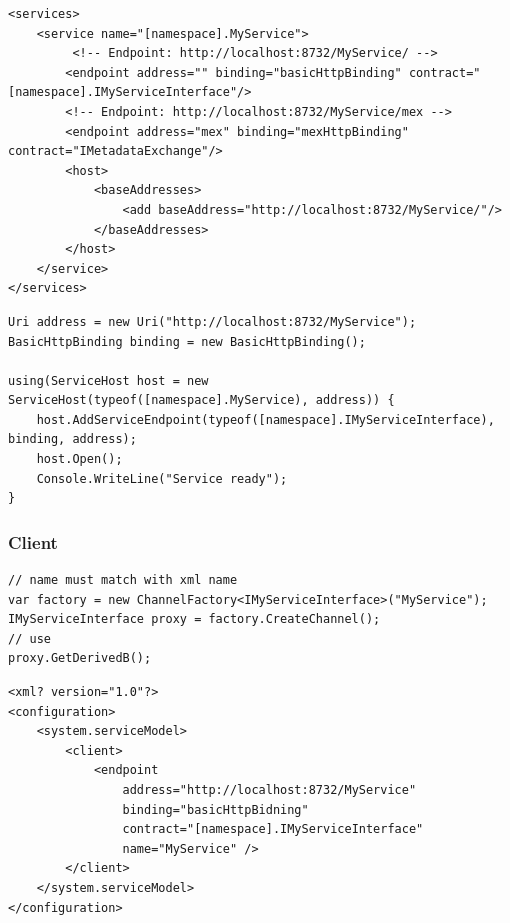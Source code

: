 \begin{lstlisting}[caption=Service Hosting via XML]
<services>
	<service name="[namespace].MyService">
		 <!-- Endpoint: http://localhost:8732/MyService/ -->
		<endpoint address="" binding="basicHttpBinding" contract="[namespace].IMyServiceInterface"/>
		<!-- Endpoint: http://localhost:8732/MyService/mex -->
		<endpoint address="mex" binding="mexHttpBinding"  contract="IMetadataExchange"/> 
		<host>
			<baseAddresses>
				<add baseAddress="http://localhost:8732/MyService/"/>
			</baseAddresses>
		</host>
	</service>
</services>
\end{lstlisting}

\clearpage

\begin{lstlisting}[caption=Service Hosting via Code]
Uri address = new Uri("http://localhost:8732/MyService");
BasicHttpBinding binding = new BasicHttpBinding();

using(ServiceHost host = new ServiceHost(typeof([namespace].MyService), address)) {
	host.AddServiceEndpoint(typeof([namespace].IMyServiceInterface), binding, address);
	host.Open();
	Console.WriteLine("Service ready");
}
\end{lstlisting}

\subsubsection{Client}
\begin{lstlisting}
// name must match with xml name
var factory = new ChannelFactory<IMyServiceInterface>("MyService");
IMyServiceInterface proxy = factory.CreateChannel();
// use
proxy.GetDerivedB();
\end{lstlisting}

\begin{lstlisting}
<xml? version="1.0"?>
<configuration>
	<system.serviceModel>
		<client>
			<endpoint
				address="http://localhost:8732/MyService"
				binding="basicHttpBidning"
				contract="[namespace].IMyServiceInterface"
				name="MyService" />
		</client>
	</system.serviceModel>
</configuration>
\end{lstlisting}

